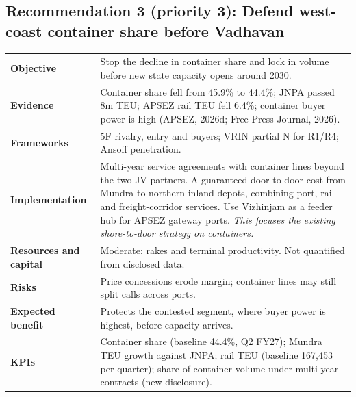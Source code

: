 \documentclass[12pt, a4paper]{article}
\newcommand{\tablesetup}{\footnotesize\renewcommand{\arraystretch}{1.25}\setlength{\tabcolsep}{4pt}}
\newcommand{\rowsep}{\addlinespace[3pt]}
\newcommand{\reclabel}[1]{\textbf{#1}}
\begin{document}
\subsection{Recommendation 3 (priority 3): Defend west-coast container share before Vadhavan}
\begingroup\tablesetup
\begin{xltabular}{\linewidth}{P{30mm}L}
\toprule
\reclabel{Objective} & Stop the decline in container share and lock in volume before new state capacity opens around 2030. \\ \rowsep
\reclabel{Evidence} & Container share fell from 45.9\% to 44.4\%; JNPA passed 8m TEU; APSEZ rail TEU fell 6.4\%; container buyer power is high (APSEZ, 2026d; Free Press Journal, 2026). \\ \rowsep
\reclabel{Frameworks} & 5F rivalry, entry and buyers; VRIN partial N for R1/R4; Ansoff penetration. \\ \rowsep
\reclabel{Implementation} & Multi-year service agreements with container lines beyond the two JV partners. A guaranteed door-to-door cost from Mundra to northern inland depots, combining port, rail and freight-corridor services. Use Vizhinjam as a feeder hub for APSEZ gateway ports. \textit{This focuses the existing shore-to-door strategy on containers.} \\ \rowsep
\reclabel{Resources and capital} & Moderate: rakes and terminal productivity. Not quantified from disclosed data. \\ \rowsep
\reclabel{Risks} & Price concessions erode margin; container lines may still split calls across ports. \\ \rowsep
\reclabel{Expected benefit} & Protects the contested segment, where buyer power is highest, before capacity arrives. \\ \rowsep
\reclabel{KPIs} & Container share (baseline 44.4\%, Q2 FY27); Mundra TEU growth against JNPA; rail TEU (baseline 167,453 per quarter); share of container volume under multi-year contracts (new disclosure). \\
\bottomrule
\end{xltabular}
\endgroup

\end{document}
